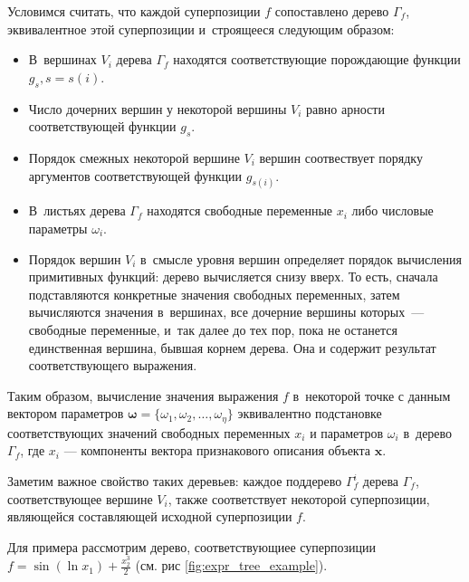 \documentclass[12pt,a4paper]{article}
\begin{document}
Условимся считать, что каждой суперпозиции $f$ сопоставлено дерево $\Gamma_f$,
эквивалентное этой суперпозиции и~строящееся следующим образом:

\begin{itemize}
  \item В~вершинах $V_i$ дерева $\Gamma_f$ находятся соответствующие
	порождающие функции $g_s, s = s(i)$.
  \item Число дочерних вершин у некоторой вершины $V_i$ равно арности
	соответствующей функции $g_s$.
  \item Порядок смежных некоторой вершине $V_i$ вершин соотвествует порядку
	аргументов соответствующей функции $g_{s(i)}$.
  \item В~листьях дерева $\Gamma_f$ находятся свободные переменные $x_i$
	либо числовые параметры $\omega_i$.
  \item Порядок вершин $V_i$ в~смысле уровня вершин определяет порядок
	вычисления примитивных функций: дерево вычисляется снизу вверх.
	То есть, сначала подставляются конкретные значения свободных переменных,
	затем вычисляются значения в~вершинах, все дочерние вершины которых~---
	свободные переменные, и~так далее до тех пор, пока не останется
	единственная вершина, бывшая корнем дерева. Она и содержит результат
	соответствующего выражения.
\end{itemize}

Таким образом, вычисление значения выражения $f$ в~некоторой точке с данным
вектором параметров $\boldsymbol{\omega} = \{ \omega_1, \omega_2, \dots, \omega_\eta\}$
эквивалентно подстановке соответствующих значений свободных переменных $x_i$
и параметров $\omega_i$ в~дерево $\Gamma_f$, где $x_i$ --- компоненты
вектора признакового описания объекта $\mathbf{x}$.

Заметим важное свойство таких деревьев: каждое поддерево $\Gamma_f^i$
дерева $\Gamma_f$, соответствующее вершине $V_i$, также соответствует
некоторой суперпозиции, являющейся составляющей исходной суперпозиции $f$.

Для примера рассмотрим дерево, соответствующиее суперпозиции
$f = \sin (\ln x_1) + \frac{x_2^3}{2}$ (см. рис \ref{fig:expr_tree_example}).
\end{document}
